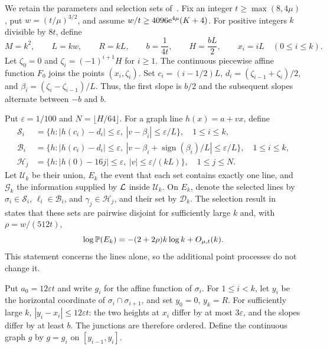 \documentclass[11pt,letterpaper]{article}
\begin{document}
We retain the parameters and selection sets of~\cite{OSC26}. Fix an integer $t\ge\max(8,4\mu)$, put $w=(t/\mu)^{3/2}$, and assume $w/t\ge4096\e^{4\mu}(K+4)$. For positive integers $k$ divisible by $8t$, define
\begin{equation}\label{eq:parameters}
 M=k^2,\qquad L=kw,\qquad R=kL,\qquad b=\frac1{4t},\qquad
 H=\frac{bL}{2},\qquad x_i=iL\quad(0\le i\le k).
\end{equation}
Let $\zeta_0=0$ and $\zeta_i=(-1)^{i+1}H$ for $i\ge1$. The continuous piecewise affine function $F_0$ joins the points $(x_i,\zeta_i)$. Set $c_i=(i-1/2)L$, $d_i=(\zeta_{i-1}+\zeta_i)/2$, and $\beta_i=(\zeta_i-\zeta_{i-1})/L$. Thus, the first slope is $b/2$ and the subsequent slopes alternate between $-b$ and $b$.

Put $\varepsilon=1/100$ and $N=\lfloor H/64\rfloor$. For a graph line $h(x)=a+vx$, define
\begin{equation}\label{eq:selection}
\begin{aligned}
 \mathscr S_i&=\{h:|h(c_i)-d_i|\le\varepsilon,
                           \ |v-\beta_i|\le\varepsilon/L\},\quad 1\le i\le k,\\
 \mathscr B_i&=\{h:|h(c_i)-d_i|\le\varepsilon,
        \ |v-\beta_i+\operatorname{sign}(\beta_i)/L|\le\varepsilon/L\},
                                                        \quad 1\le i\le k,\\
 \mathscr H_j&=\{h:|h(0)-16j|\le\varepsilon,
                           \ |v|\le\varepsilon/(kL)\},\quad 1\le j\le N.
\end{aligned}
\end{equation}
Let $\mathscr U_k$ be their union, $E_k$ the event that each set contains exactly one line, and $\mathcal G_k$ the information supplied by $\cL$ inside $\mathscr U_k$. On $E_k$, denote the selected lines by $\sigma_i\in\mathscr S_i$, $\ell_i\in\mathscr B_i$, and $\gamma_j\in\mathscr H_j$, and their set by $\mathcal D_k$. The selection result in~\cite[Proposition~2.1]{OSC26} states that these sets are pairwise disjoint for sufficiently large $k$ and, with $\rho=w/(512t)$,
\begin{equation}\label{eq:selection-cost}
 \log\P(E_k)=-(2+2\rho)k\log k+O_{\mu,t}(k).
\end{equation}
This statement concerns the lines alone, so the additional point processes do not change it.

Put $a_0=12\varepsilon t$ and write $g_i$ for the affine function of $\sigma_i$. For $1\le i<k$, let $y_i$ be the horizontal coordinate of $\sigma_i\cap\sigma_{i+1}$, and set $y_0=0$, $y_k=R$. For sufficiently large $k$, $|y_i-x_i|\le12\varepsilon t$: the two heights at $x_i$ differ by at most $3\varepsilon$, and the slopes differ by at least $b$. The junctions are therefore ordered. Define the continuous graph $g$ by $g=g_i$ on $[y_{i-1},y_i]$.
\end{document}
